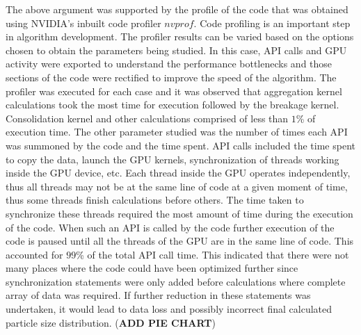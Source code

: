 \documentclass[preprint,10pt,authoryear,review]{elsarticle}
\begin{document}
\begin{linenumbers}
The above argument was supported by the profile of the code that was obtained using NVIDIA's
inbuilt code profiler $nvprof$. Code profiling is an important step in algorithm development. 
The profiler results can be varied based on the options chosen to obtain the parameters being 
studied. In this case, API calls and GPU activity were exported to understand the performance 
bottlenecks and those sections of the code were rectified to improve the speed of the algorithm.
The profiler was executed for each case and it was observed that aggregation kernel calculations 
took the most time for execution followed by the breakage kernel. Consolidation kernel 
and other calculations comprised of less than $1$\% of execution time. The other parameter 
studied was the number of times each API was summoned by the code and the time spent. API 
calls included the time spent to copy the data, launch the GPU kernels, synchronization of 
threads working inside the GPU device, etc. Each thread inside the GPU operates independently,
thus all threads may not be at the same line of code at a given moment of time, thus some threads 
finish calculations before others. The time taken to synchronize these threads required the most 
amount of time during the execution of the code. When such an API is called by the code 
further execution of the code is paused until all the threads of the GPU are in the same 
line of code. This accounted for $99$\% of the total API call time. This indicated that there 
were not many places where the code could have been optimized further since synchronization 
statements were only added before calculations where complete array of data was required. 
If further reduction in these statements was undertaken, it would lead to data loss and 
possibly incorrect final calculated particle size distribution. (\textbf{ADD PIE CHART})


\end{linenumbers}
\end{document}
